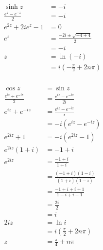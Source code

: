 \documentclass{article}
\begin{document}
\setcounter{subsubsection}{16}
\subsubsection{}

\begin{align*}
  \sinh z                & = -i                                        \\
  \frac{e^z - e^{-z}}{2} & = -i                                        \\
  e^{2 z} + 2 i e^z - 1  & = 0                                         \\
  e^z                    & = \frac{-2 i \pm \sqrt{-4 + 4}}{2}          \\
                         & = -i                                        \\
  z                      & = \ln (-i)                                  \\
                         & = i \left( -\frac{\pi}{2} + 2 n \pi \right)
\end{align*}

\setcounter{subsubsection}{18}
\subsubsection{}

\begin{align*}
  \cos z                       & = \sin z                                   \\
  \frac{e^{i z} + e^{-i z}}{2} & = \frac{e^{i z} - e^{-i z}}{2 i}           \\
  e^{i z} + e^{-i z}           & = \frac{e^{i z} - e^{-i z}}{i}             \\
                               & = -i (e^{i z} - e^{-i z})                  \\
  e^{2 i z} + 1                & = -i (e^{2 i z} - 1)                       \\
  e^{2 i z} (1 + i)            & = -1 + i                                   \\
  e^{2 i z}                    & = \frac{-1 + i}{1 + i}                     \\
                               & = \frac{(-1 + i)(1 - i)}{(1 + i) (1 - i)}  \\
                               & = \frac{-1 + i + i + 1}{1 - i + i + 1}     \\
                               & = \frac{2 i}{2}                            \\
                               & = i                                        \\
  2 i z                        & = \ln i                                    \\
                               & = i \left( \frac{\pi}{2} + 2 n \pi \right) \\
  z                            & = \frac{\pi}{4} + n \pi
\end{align*}
\end{document}
